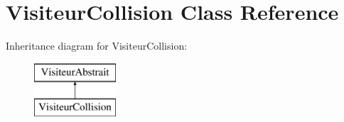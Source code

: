 \hypertarget{class_visiteur_collision}{}\section{Visiteur\+Collision Class Reference}
\label{class_visiteur_collision}
Inheritance diagram for Visiteur\+Collision\+:\begin{figure}[H]
\begin{center}
\leavevmode
\includegraphics[height=2.000000cm]{class_visiteur_collision}
\end{center}
\end{figure}

